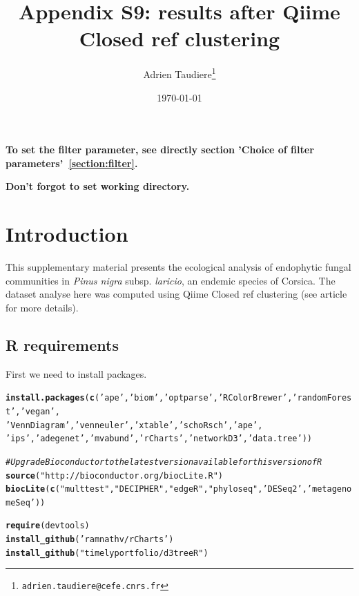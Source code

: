 \documentclass[12pt]{article}\usepackage[]{graphicx}\usepackage[]{color}
\title{Appendix S9: results after Qiime Closed ref clustering}
\author{Adrien Taudiere\thanks{\texttt{adrien.taudiere@cefe.cnrs.fr}}}
\affil{{\footnotesize CEFE - Centre d'Ecologie Fonctionnelle et Evolutive, Montpellier: France}}
\date{\today}
\makeatletter
\newcommand{\hlstr}[1]{\textcolor[rgb]{0.192,0.494,0.8}{#1}}%
\newcommand{\hlcom}[1]{\textcolor[rgb]{0.678,0.584,0.686}{\textit{#1}}}%
\newcommand{\hlstd}[1]{\textcolor[rgb]{0.345,0.345,0.345}{#1}}%
\newcommand{\hlkwd}[1]{\textcolor[rgb]{0.737,0.353,0.396}{\textbf{#1}}}%
\newenvironment{kframe}{%
 \def\at@end@of@kframe{}%
 \ifinner\ifhmode%
  \def\at@end@of@kframe{\end{minipage}}%
  \begin{minipage}{\columnwidth}%
 \fi\fi%
 \def\FrameCommand##1{\hskip\@totalleftmargin \hskip-\fboxsep
 \colorbox{shadecolor}{##1}\hskip-\fboxsep
     \hskip-\linewidth \hskip-\@totalleftmargin \hskip\columnwidth}%
 \MakeFramed {\advance\hsize-\width
   \@totalleftmargin\z@ \linewidth\hsize
   \@setminipage}}%
 {\par\unskip\endMakeFramed%
 \at@end@of@kframe}
\newenvironment{knitrout}{}{} %
\numberwithin{figure}{section}
\makeatother
\begin{document}






\maketitle

\vfill
\begin{center}
\textbf{To set the filter parameter, see directly section 'Choice of filter parameters'~\ref{section:filter}.}

\textbf{Don't forgot to set working directory.}
\end{center}

\newpage
\tableofcontents
\newpage


\section{Introduction}

This supplementary material presents the ecological analysis of endophytic fungal communities in \textit{Pinus nigra} subsp. \textit{laricio}, an endemic species of Corsica. The dataset analyse here was computed using Qiime Closed ref clustering (see article for more details).

\subsection{R requirements}

First we need to install packages.
\begin{knitrout}\small
{}\color{fgcolor}\begin{kframe}
\begin{alltt}
\hlkwd{install.packages}\hlstd{(}\hlkwd{c}\hlstd{(}\hlstr{'ape'}\hlstd{,} \hlstr{'biom'}\hlstd{,} \hlstr{'optparse'}\hlstd{,} \hlstr{'RColorBrewer'}\hlstd{,} \hlstr{'randomForest'}\hlstd{,}  \hlstr{'vegan'}\hlstd{,}
                  \hlstr{'VennDiagram'}\hlstd{,} \hlstr{'venneuler'}\hlstd{,} \hlstr{'xtable'}\hlstd{,} \hlstr{'schoRsch'}\hlstd{,} \hlstr{'ape'}\hlstd{,}
                 \hlstr{'ips'}\hlstd{,} \hlstr{'adegenet'}\hlstd{,} \hlstr{'mvabund'}\hlstd{,} \hlstr{'rCharts'}\hlstd{,} \hlstr{'networkD3'}\hlstd{,} \hlstr{'data.tree'}\hlstd{))}

\hlcom{# Upgrade Bioconductor to the latest version available for this version of R}
\hlkwd{source}\hlstd{(}\hlstr{"http://bioconductor.org/biocLite.R"}\hlstd{)}
\hlkwd{biocLite}\hlstd{(}\hlkwd{c}\hlstd{(}\hlstr{"multtest"}\hlstd{,} \hlstr{"DECIPHER"}\hlstd{,} \hlstr{"edgeR"}\hlstd{,} \hlstr{"phyloseq"}\hlstd{,} \hlstr{'DESeq2'}\hlstd{,} \hlstr{'metagenomeSeq'}\hlstd{))}

\hlkwd{require}\hlstd{(devtools)}
\hlkwd{install_github}\hlstd{(}\hlstr{'ramnathv/rCharts'}\hlstd{)}
\hlkwd{install_github}\hlstd{(}\hlstr{"timelyportfolio/d3treeR"}\hlstd{)}
\end{alltt}
\end{kframe}
\end{knitrout}
\end{document}
